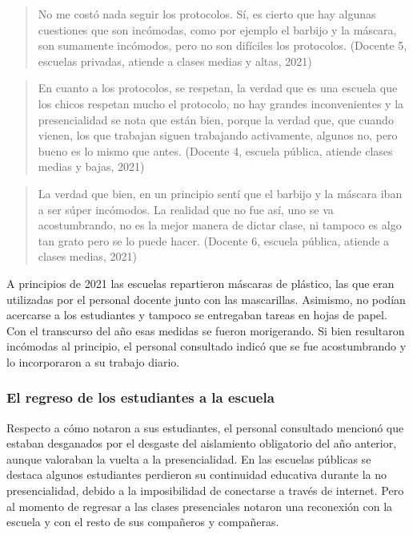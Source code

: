\documentclass[spanish]{textolivre}
\begin{document}
\begin{quote}
    No me costó nada seguir los protocolos. Sí, es cierto que hay algunas cuestiones que son incómodas, como por ejemplo el barbijo y la máscara, son sumamente incómodos, pero no son difíciles los protocolos. (Docente 5, escuelas privadas, atiende a clases medias y altas, 2021)
\end{quote}

\begin{quote}
    En cuanto a los protocolos, se respetan, la verdad que es una escuela que los chicos respetan mucho el protocolo, no hay grandes inconvenientes y la presencialidad se nota que están bien, porque la verdad que, que cuando vienen, los que trabajan siguen trabajando activamente, algunos no, pero bueno es lo mismo que antes. (Docente 4, escuela pública, atiende clases medias y bajas, 2021)
\end{quote}

\begin{quote}
    La verdad que bien, en un principio sentí que el barbijo y la máscara iban a ser súper incómodos. La realidad que no fue así, uno se va acostumbrando, no es la mejor manera de dictar clase, ni tampoco es algo tan grato pero se lo puede hacer. (Docente 6, escuela pública, atiende a clases medias, 2021)
\end{quote}

A principios de 2021 las escuelas repartieron máscaras de plástico, las que eran utilizadas por el personal docente junto con las mascarillas. Asimismo, no podían acercarse a los estudiantes y tampoco se entregaban tareas en hojas de papel. Con el transcurso del año esas medidas se fueron morigerando. Si bien resultaron incómodas al principio, el personal consultado indicó que se fue acostumbrando y lo incorporaron a su trabajo diario.

\subsubsection{El regreso de los estudiantes a la escuela}\label{sec-resumo}
Respecto a cómo notaron a sus estudiantes, el personal consultado mencionó que estaban desganados por el desgaste del aislamiento obligatorio del año anterior, aunque valoraban la vuelta a la presencialidad. En las escuelas públicas se destaca algunos estudiantes perdieron su continuidad educativa durante la no presencialidad, debido a la imposibilidad de conectarse a través de internet. Pero al momento de regresar a las clases presenciales notaron una reconexión con la escuela y con el resto de sus compañeros y compañeras.
\end{document}
